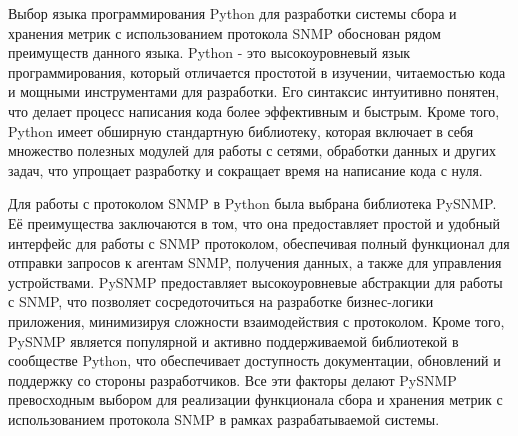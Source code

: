 Выбор языка программирования Python для разработки системы сбора и хранения метрик с использованием протокола SNMP обоснован рядом преимуществ данного языка. Python - это высокоуровневый язык программирования, который отличается простотой в изучении, читаемостью кода и мощными инструментами для разработки. Его синтаксис интуитивно понятен, что делает процесс написания кода более эффективным и быстрым. Кроме того, Python имеет обширную стандартную библиотеку, которая включает в себя множество полезных модулей для работы с сетями, обработки данных и других задач, что упрощает разработку и сокращает время на написание кода с нуля.

Для работы с протоколом SNMP в Python была выбрана библиотека PySNMP\cite{pysnmpSNMPLibrary}. Её преимущества заключаются в том, что она предоставляет простой и удобный интерфейс для работы с SNMP протоколом, обеспечивая полный функционал для отправки запросов к агентам SNMP, получения данных, а также для управления устройствами. PySNMP предоставляет высокоуровневые абстракции для работы с SNMP, что позволяет сосредоточиться на разработке бизнес-логики приложения, минимизируя сложности взаимодействия с протоколом. Кроме того, PySNMP является популярной и активно поддерживаемой библиотекой в сообществе Python, что обеспечивает доступность документации, обновлений и поддержку со стороны разработчиков. Все эти факторы делают PySNMP превосходным выбором для реализации функционала сбора и хранения метрик с использованием протокола SNMP в рамках разрабатываемой системы.